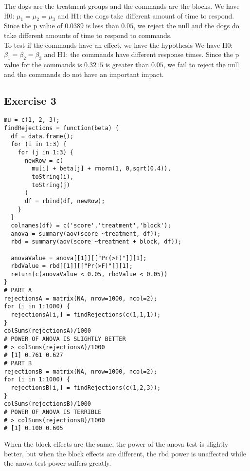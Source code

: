 \documentclass{article}
\begin{document}
The dogs are the treatment groups and the commands are the blocks.
We have H0: $\mu_1 = \mu_2 = \mu_3$ and 
H1: the dogs take different amount of time to respond.
Since the p value of $0.0389$ is less than $0.05$,
we reject the null and the dogs do take different amounts of time to respond to commands. \\

To test if the commands have an effect, we have the hypothesis
We have H0: $\beta_1 = \beta_2 = \beta_3$ and 
H1: the commands have different response times.
Since the p value for the commands is $0.3215$ is greater than $0.05$,
we fail to reject the null and the commands do not have an important impact.
\newpage

\subsection*{Exercise 3}
\begin{lstlisting}
mu = c(1, 2, 3);
findRejections = function(beta) {
  df = data.frame();
  for (i in 1:3) {
    for (j in 1:3) {
      newRow = c(
        mu[i] + beta[j] + rnorm(1, 0,sqrt(0.4)),
        toString(i),
        toString(j)
      )
      df = rbind(df, newRow);
    }
  }
  colnames(df) = c('score','treatment','block');
  anova = summary(aov(score ~treatment, df));
  rbd = summary(aov(score ~treatment + block, df));

  anovaValue = anova[[1]][["Pr(>F)"]][1];
  rbdValue = rbd[[1]][["Pr(>F)"]][1];
  return(c(anovaValue < 0.05, rbdValue < 0.05))
}
# PART A
rejectionsA = matrix(NA, nrow=1000, ncol=2);
for (i in 1:1000) {
  rejectionsA[i,] = findRejections(c(1,1,1));
}
colSums(rejectionsA)/1000
# POWER OF ANOVA IS SLIGHTLY BETTER
# > colSums(rejectionsA)/1000
# [1] 0.761 0.627
# PART B
rejectionsB = matrix(NA, nrow=1000, ncol=2);
for (i in 1:1000) {
  rejectionsB[i,] = findRejections(c(1,2,3));
}
colSums(rejectionsB)/1000
# POWER OF ANOVA IS TERRIBLE
# > colSums(rejectionsB)/1000
# [1] 0.100 0.605
\end{lstlisting}

When the block effects are the same, the power of the anova test is slightly better,
but when the block effects are different, the rbd power is unaffected while the
anova test power suffers greatly. 
\end{document}
